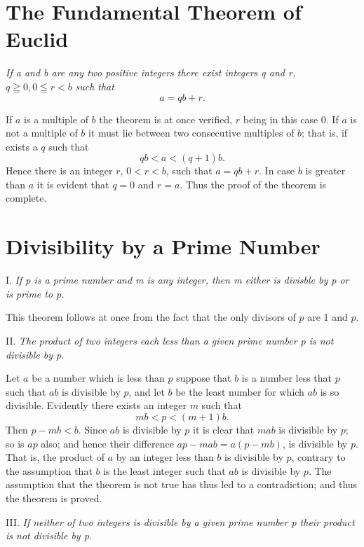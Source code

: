 \documentclass[oneside,12pt]{book}
\begin{document}
\section{The Fundamental Theorem of Euclid}
\textit{If a and b are any two positive integers there exist integers q and r,} $q\geqq 0,0\leqq r<b$ \textit{such that}
$$a=qb+r.$$ \par

If $a$ is a multiple of $b$ the theorem is at once verified, $r$ being in this case 0. If $a$ is not a multiple of $b$ it must lie between two consecutive multiples of $b$; that is, if exists a $q$ such that 
$$qb<a<(q+1)b.$$
Hence there is an integer $r$, $0<r<b$, such that $a=qb+r$. In case $b$ is greater than $a$ it is evident that $q=0$ and $r=a$. Thus the proof of the theorem is complete. \par 

\section{Divisibility by a Prime Number}
I. \textit{If p is a prime number and m is any integer, then m either is divisble by p or is prime to p.} \par 

This theorem follows at once from the fact that the only divisors of $p$ are 1 and $p$. \par 

II. \textit{The product of two integers each less than a given prime number p is not divisible by p.} \par 

Let $a$ be a number which is less than $p$ suppose that $b$ is a number less that $p$ such that $ab$ is divisible by $p$, and let $b$ be the least number for which $ab$ is so divisible. Evidently there exists an integer $m$ such that 
$$mb<p<(m+1)b.$$
Then $p-mb<b$. Since $ab$ is divisible by $p$ it is clear that $mab$ is divisible by $p$; so is $ap$ also; and hence their difference $ap-mab=a(p-mb)$, is divisible by $p$. That is, the product of $a$ by an integer less than $b$ is divisible by $p$, contrary to the assumption that $b$ is the least integer such that $ab$ is divisible by $p$. The assumption that the theorem is not true has thus led to a contradiction; and thus the theorem is proved. \par 

III. \textit{If neither of two integers is divisible by a given prime number p their product is not divisible by p.} \par 
\end{document}
